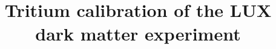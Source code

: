 \documentclass[twocolumn,superscriptaddress,linenumbers,prd]{revtex4-1}
\begin{document}
\title{Tritium calibration of the LUX dark matter experiment}





		\maketitle










\appendix





\newpage
\thispagestyle{empty}
\mbox{}
\newpage
\thispagestyle{empty}
\mbox{}


\end{document}
